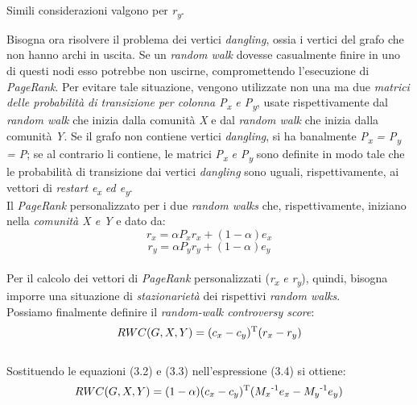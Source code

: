 \begin{enumerate}
\begin{itemize}
\\Simili considerazioni valgono per \textit{r\textsubscript{y}}.
\end{itemize}
Bisogna ora risolvere il problema dei vertici \textit{dangling}, ossia i vertici del grafo che non hanno archi in uscita. Se un \textit{random walk} dovesse casualmente finire in uno di questi nodi esso potrebbe non uscirne, compromettendo l'esecuzione di \textit{PageRank}. Per evitare tale situazione, vengono utilizzate non una ma due \textit{matrici delle probabilità di transizione per colonna P\textsubscript{x} e P\textsubscript{y}}, usate rispettivamente dal \textit{random walk} che inizia dalla comunità \textit{X} e dal \textit{random walk} che inizia dalla comunità \textit{Y}. Se il grafo non contiene vertici \textit{dangling}, si ha banalmente \textit{P\textsubscript{x} = P\textsubscript{y} = P}; se al contrario li contiene, le matrici \textit{P\textsubscript{x} e P\textsubscript{y}} sono definite in modo tale che le probabilità di transizione dai vertici \textit{dangling} sono uguali, rispettivamente, ai vettori di \textit{restart} \textit{e\textsubscript{x} ed e\textsubscript{y}}.
\\Il \textit{PageRank} personalizzato per i due \textit{random walks} che, rispettivamente, iniziano nella \textit{comunità X e Y} e dato da:
\\
\begin{equation}
r_x = \alpha P_xr_x + (1-\alpha)e_x
\end{equation}
\begin{equation}
r_y = \alpha P_yr_y + (1-\alpha)e_y
\end{equation}
\\
Per il calcolo dei vettori di \textit{PageRank} personalizzati (\textit{r\textsubscript{x} e r\textsubscript{y}}), quindi, bisogna imporre una situazione di \textit{stazionarietà} dei rispettivi \textit{random walks}. 
\\Possiamo finalmente definire il \textit{random-walk controversy score}:
\\
\begin{equation}
RWC(G,X,Y) = (c_x - c_y)\textsuperscript{T}(r_x - r_y)
\end{equation}
\\
Sostituendo le equazioni (3.2) e (3.3) nell'espressione (3.4) si ottiene:
\\
\begin{equation}
RWC(G,X,Y) = (1 - \alpha)(c_x - c_y)\textsuperscript{T}(M_x\textsuperscript{-1}e_x - M_y\textsuperscript{-1}e_y)

\end{equation}
\end{enumerate}
